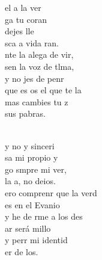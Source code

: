 \documentclass[12pt]{article}
\begin{document}
\begin{multicols*}{2}
\begin{cancion}%
	 el a la ver \\
	ga tu coran \\
	  dejes lle\\
	sca a vida ran. \\
\jump
	nte la alega de vir, \\
	sen la voz de tlma, \\
	y no jes de penr\\
	que es os el que te la\\
	mas  cambies tu z\\
	 sus pabras.\\\jump\\
	\begin{chorus}%
	y no y sinceri\\
	sa mi propio y\\
	go smpre mi ver,\\
	 la a, no deios.\\
\jump
	ero comprenr que la verd\\
	es en el Evanio \\
	y he de rme a los des \\
	ar será millo\\
	y perr mi identid\\
	er de los.\\
	\end{chorus}%
	\jump\\
\end{cancion}%


\end{multicols*}
\end{document}
